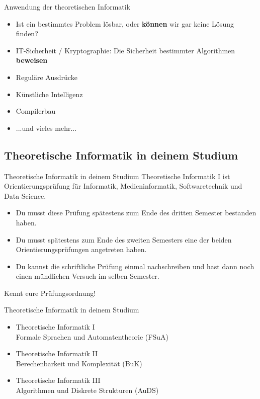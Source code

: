 \documentclass[10pt]{beamer}
\begin{document}
\begin{frame}{Anwendung der theoretischen Informatik}
    \begin{itemize}
        \item Ist ein bestimmtes Problem lösbar, oder \textbf{können} wir gar keine Lösung finden?
        \item IT-Sicherheit / Kryptographie: Die Sicherheit bestimmter Algorithmen \textbf{beweisen}
        \item Reguläre Ausdrücke
        \item Künstliche Intelligenz
        \item Compilerbau
        \item ...und vieles mehr...
    \end{itemize}
\end{frame}

\subsection{Theoretische Informatik in deinem Studium}
\begin{frame}[fragile]{Theoretische Informatik in deinem Studium}
Theoretische Informatik I ist Orientierungsprüfung für Informatik, Medieninformatik, Softwaretechnik und Data Science.
    \begin{itemize} 
    \item Du musst diese Prüfung spätestens zum Ende des dritten Semester bestanden haben.
    \item Du musst spätestens zum Ende des zweiten Semesters eine der beiden Orientierungsprüfungen angetreten haben.
    \item Du kannst die schriftliche Prüfung einmal nachschreiben und hast dann noch einen mündlichen Versuch im selben Semester.
    \end{itemize}
    \alert{Kennt eure Prüfungsordnung!}
\end{frame}

\begin{frame}{Theoretische Informatik in deinem Studium}
    \begin{itemize}
        \item Theoretische Informatik I\\
        Formale Sprachen und Automatentheorie (FSuA)
        \item Theoretische Informatik II\\
        Berechenbarkeit und Komplexität (BuK)
        \item Theoretische Informatik III\\
        Algorithmen und Diskrete Strukturen (AuDS)
    \end{itemize}
\end{frame}
\end{document}
